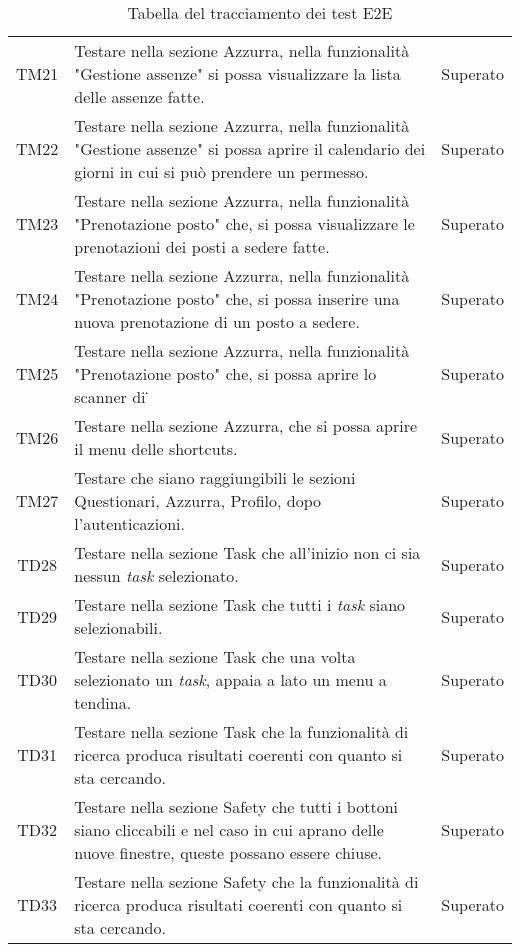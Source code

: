 \begin{table}[h]%
	\renewcommand{\arraystretch}{1.6}
	\centering
	\begin{tabularx}{\textwidth}{c X c}
		\hline	
		\rowcolor{heavenly}
		\intest{Codice} &  \intest{Descrizione} & \intest{Esito}\\	
		\hline	
		TM21 & Testare nella sezione Azzurra, nella funzionalità "Gestione assenze" si possa visualizzare la lista delle assenze fatte. & Superato\\
		TM22 & Testare nella sezione Azzurra, nella funzionalità "Gestione assenze" si possa aprire il calendario dei giorni in cui si può prendere un permesso. & Superato\\
		TM23 & Testare nella sezione Azzurra, nella funzionalità "Prenotazione posto" che, si possa visualizzare le prenotazioni dei posti a sedere fatte. & Superato\\
		TM24 & Testare nella sezione Azzurra, nella funzionalità "Prenotazione posto" che, si possa inserire una nuova prenotazione di un posto a sedere. & Superato\\
		TM25 & Testare nella sezione Azzurra, nella funzionalità "Prenotazione posto" che, si possa aprire lo scanner di \g{QR code}\. & Superato\\
		TM26 & Testare nella sezione Azzurra, che si possa aprire il menu delle shortcuts. & Superato\\
		TM27 & Testare che siano raggiungibili le sezioni Questionari, Azzurra, Profilo, dopo l'autenticazioni. & Superato \\
		TD28 & Testare nella sezione Task che all'inizio non ci sia nessun \emph{task} selezionato. & Superato \\
		TD29 & Testare nella sezione Task che tutti i \emph{task} siano selezionabili. & Superato \\
		TD30 & Testare nella sezione Task che una volta selezionato un \emph{task}, appaia a lato un menu a tendina. & Superato \\
		TD31 & Testare nella sezione Task che la funzionalità di ricerca produca risultati coerenti con quanto si sta cercando. & Superato \\
		TD32 & Testare nella sezione Safety che tutti i bottoni siano cliccabili e nel caso in cui aprano delle nuove finestre, queste possano essere chiuse. & Superato \\
		TD33 & Testare nella sezione Safety che la funzionalità di ricerca produca risultati coerenti con quanto si sta cercando. & Superato \\
		\hline
	\end{tabularx} \hbox{}
	\caption{Tabella del tracciamento dei test E2E}
\end{table}%
\clearpage
